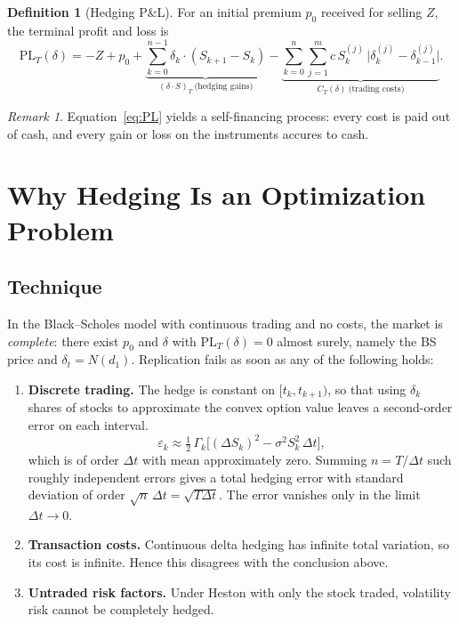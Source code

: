 \documentclass[11pt]{article}
\theoremstyle{definition}
\newtheorem{definition}[theorem]{Definition}
\theoremstyle{remark}
\newtheorem{remark}[theorem]{Remark}
\newcommand{\PL}{\mathrm{PL}}
\begin{document}
\begin{definition}[Hedging P\&L]
For an initial premium $p_0$ received for selling $Z$, the terminal profit and loss is
\begin{equation}\label{eq:PL}
\PL_T(\delta)
= -Z + p_0
+ \underbrace{\sum_{k=0}^{n-1}\delta_k\cdot(S_{k+1}-S_k)}_{(\delta\cdot S)_T\ \text{(hedging gains)}}
- \underbrace{\sum_{k=0}^{n}\sum_{j=1}^m c\,S^{(j)}_k\,\bigl|\delta^{(j)}_k-\delta^{(j)}_{k-1}\bigr|}_{C_T(\delta)\ \text{(trading costs)}} .
\end{equation}
\end{definition}

\begin{remark}
Equation~\eqref{eq:PL} yields a self-financing process: every cost is paid out of cash, and every gain or loss on the instruments accures to cash. 
\end{remark}

\section{Why Hedging Is an Optimization Problem}

\subsection{Technique}

In the Black--Scholes model with continuous trading and no costs, the market is \emph{complete}:
there exist $p_0$ and $\delta$ with $\PL_T(\delta)=0$ almost surely, namely the BS price and
$\delta_t=N(d_1)$. Replication fails as soon as any of the following holds:

\begin{enumerate}[leftmargin=*]
  \item \textbf{Discrete trading.} The hedge is constant on $[t_k,t_{k+1})$, so that using $\delta_k$ shares of stocks to approximate the convex option value leaves a second-order error on each interval.
$$\varepsilon_k \approx \tfrac12\,\Gamma_k\bigl[(\Delta S_k)^2-\sigma^2S_k^2\,\Delta t\bigr],
  $$
  which is of order $\Delta t$ with mean approximately zero. Summing $n=T/\Delta t$ such roughly independent errors gives a total hedging error with standard deviation of order $\sqrt{n}\,\Delta t=\sqrt{T\Delta t}$. The error vanishes only in the limit $\Delta t\to0$.
  \item \textbf{Transaction costs.} Continuous delta hedging has infinite total variation, so its cost is infinite. Hence this disagrees with the conclusion above. 
  \item \textbf{Untraded risk factors.} Under Heston with only the stock traded, volatility risk cannot be completely hedged. 
\end{enumerate}
\end{document}

